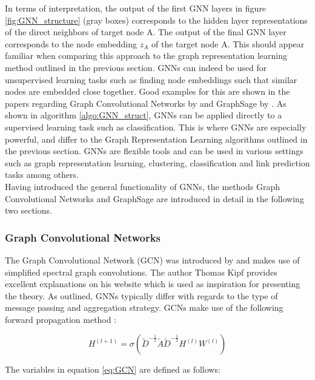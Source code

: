 	\noindent In terms of interpretation, the output of the first GNN layers in
	figure \ref{fig:GNN_structure} (gray boxes) corresponds to the hidden layer 
	representations of the direct neighbors of target node A. The output of 
	the final GNN layer corresponds to the node embedding $z_{A}$ of the target 
	node A. This should appear familiar when comparing this approach to the graph 
	representation learning method outlined in the previous section. 
	GNNs can indeed be used for unsupervised learning tasks such as finding node 
	embeddings such that similar nodes are embedded close together. Good
	examples for this are shown in the papers regarding Graph Convolutional
	Networks by \cite{kipf2016semi} and GraphSage by
	\cite{hamilton2017inductive}. As shown in algorithm \ref{algo:GNN_struct},
	GNNs can be applied directly to a supervised learning task such as
	classification. This is where GNNs are especially powerful, and differ to
	the Graph Representation Learning algorithms outlined in the previous
	section. GNNs are flexible tools and can be used in various settings such
	as graph representation learning, clustering, classification and link
	prediction tasks among others. \\

	\noindent Having introduced the general functionality of GNNs, the methods
	Graph Convolutional Networks and GraphSage are introduced in detail in the
	following two sections. 


	\subsubsection{Graph Convolutional Networks}
	
	\noindent The Graph Convolutional Network (GCN) was introduced by 
	\cite{kipf2016semi} and makes use of simplified spectral graph
	convolutions. The author Thomas Kipf \citeyearpar{kipf2016online} provides 
	excellent explanations on his website which is used as inspiration for
	presenting the theory. As outlined, GNNs typically differ with regards to
	the type of message passing and aggregation strategy. GCNs make use of the
	following forward propagation method \citep[p. 2]{kipf2016semi}:

	\begin{equation}
		H^{(l+1)} = \sigma\left(\tilde D^{-\frac{1}{2}}\tilde A \tilde
		D^{-\frac{1}{2}}H^{(l)}W^{(l)}\right)
		\label{eq:GCN}
	\end{equation}
	
	\noindent The variables in equation \ref{eq:GCN} are defined as follows:

